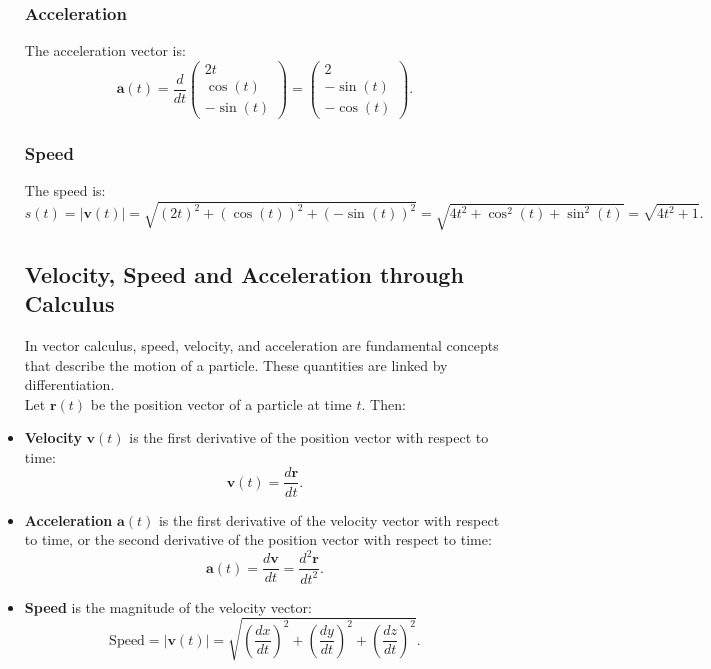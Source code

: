\documentclass[a4paper,12pt]{article}
\begin{document}
\begin{itemize}[leftmargin=*]
\subsubsection*{Acceleration}

The acceleration vector is:
\[
\mathbf{a}(t) = \frac{d}{dt} \begin{pmatrix} 2t \\ \cos(t) \\ -\sin(t) \end{pmatrix} = \begin{pmatrix} 2 \\ -\sin(t) \\ -\cos(t) \end{pmatrix}.
\]

\subsubsection*{Speed}

The speed is:
\[
s(t) = |\mathbf{v}(t)| = \sqrt{(2t)^2 + (\cos(t))^2 + (-\sin(t))^2} = \sqrt{4t^2 + \cos^2(t) + \sin^2(t)} = \sqrt{4t^2 + 1}.
\]

\subsection{Velocity, Speed and Acceleration through Calculus}

In vector calculus, speed, velocity, and acceleration are fundamental concepts that describe the motion of a particle. These quantities are linked by differentiation.\\


Let \(\mathbf{r}(t)\) be the position vector of a particle at time \(t\). Then:

    \item \textbf{Velocity} \(\mathbf{v}(t)\) is the first derivative of the position vector with respect to time:
    \[
    \mathbf{v}(t) = \frac{d\mathbf{r}}{dt}.
    \]
    \item \textbf{Acceleration} \(\mathbf{a}(t)\) is the first derivative of the velocity vector with respect to time, or the second derivative of the position vector with respect to time:
    \[
    \mathbf{a}(t) = \frac{d\mathbf{v}}{dt} = \frac{d^2\mathbf{r}}{dt^2}.
    \]
    \item \textbf{Speed} is the magnitude of the velocity vector:
    \[
    \text{Speed} = |\mathbf{v}(t)| = \sqrt{\left(\frac{dx}{dt}\right)^2 + \left(\frac{dy}{dt}\right)^2 + \left(\frac{dz}{dt}\right)^2}.
    \]


\end{itemize}
\end{document}
